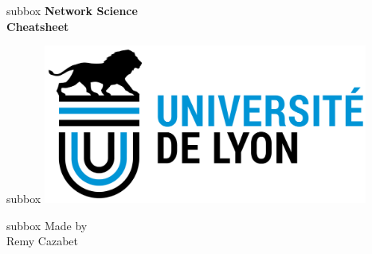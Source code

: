 

\begin{subbox}{subbox}{}
\centering
\Large{\textbf{Network Science   \\ Cheatsheet}}
\end{subbox}

\begin{multibox}{2}
\begin{subbox}{subbox}{}
\centering
\includegraphics[width=0.8\textwidth]{pics/logo.png}
\end{subbox}
\begin{subbox}{subbox}{}
\centering
Made by \\
\large{
Remy Cazabet
}
\end{subbox}
\end{multibox}